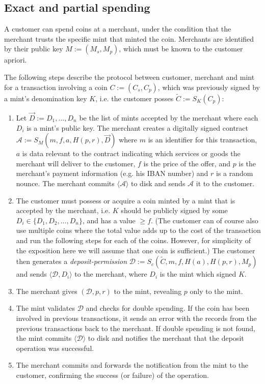 \documentclass{llncs}
\begin{document}
\subsection{Exact and partial spending}

A customer can spend coins at a merchant, under the condition that the
merchant trusts the specific mint that minted the coin.  Merchants are
identified by their public key $M := (M_s, M_p)$, which must be known
to the customer apriori.

The following steps describe the protocol between customer, merchant and mint
for a transaction involving a coin $C := (C_s, C_p)$, which was previously signed
by a mint's denomination key $K$, i.e. the customer posses
$\widetilde{C} := S_K(C_p)$:

\begin{enumerate}
\item\label{contract} Let $\vec{D} := D_1, \ldots, D_n$ be the list of
  mints accepted by the merchant where each $D_i$ is a mint's public
  key.  The merchant creates a digitally signed contract $\mathcal{A}
  := S_M(m, f, a, H(p, r), \vec{D})$ where $m$ is an identifier for this
  transaction, $a$ is data relevant to the contract indicating which services
  or goods the merchant will deliver to the customer, $f$ is the price of the offer,
  and $p$ is the merchant's payment information (e.g. his IBAN number) and $r$ is
  a random nounce.  The merchant commits $\langle \mathcal{A}
  \rangle$ to disk and sends $\mathcal{A}$ it to the customer.
\item\label{deposit} The customer must possess or acquire a coin minted by a mint that is
  accepted by the merchant, i.e. $K$ should be publicly signed by some $D_i
  \in \{D_1, D_2, \ldots, D_n\}$, and has a value $\geq f$. (The customer
  can of course also use multiple coins where the total value adds up to
  the cost of the transaction and run the following steps for each of
  the coins. However, for simplicity of the exposition here we will
  assume that one coin is sufficient.)
%
  The customer then generates a \emph{deposit-permission} $\mathcal{D} :=
  S_c(\widetilde{C}, m, f, H(a), H(p,r), M_p)$
  and sends $\langle \mathcal{D}, D_i\rangle$ to the merchant,
  where $D_i$ is the mint which signed $K$.
\item The merchant gives $(\mathcal{D}, p, r)$ to the mint, revealing $p$
  only to the mint.

\item The mint validates $\mathcal{D}$ and checks for double spending.
  If the coin has been involved in previous transactions, it sends an error
  with the records from the previous transactions back to the merchant.
%
  If double spending is not found, the mint commits $\langle \mathcal{D} \rangle$ to disk
  and notifies the merchant that the deposit operation was successful.

\item The merchant commits and forwards the notification from the mint to the
  customer, confirming the success (or failure) of the operation.
\end{enumerate}
\end{document}
